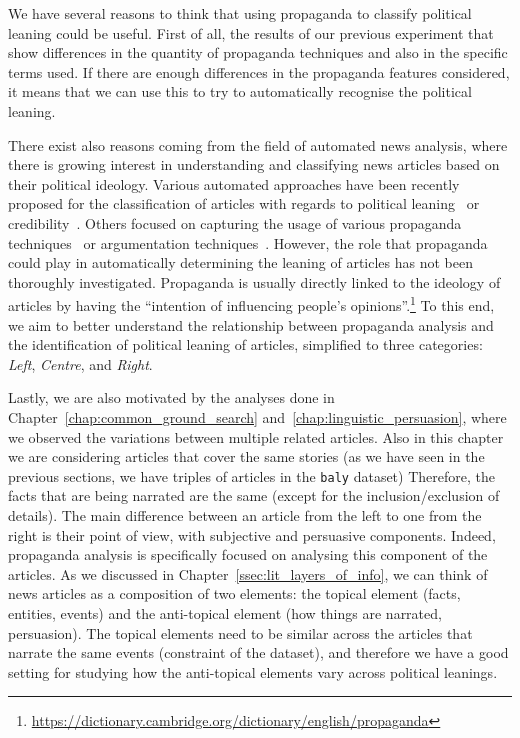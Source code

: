 We have several reasons to think that using propaganda to classify political leaning could be useful.
First of all, the results of our previous experiment that show differences in the quantity of propaganda techniques and also in the specific terms used.
If there are enough differences in the propaganda features considered, it means that we can use this to try to automatically recognise the political leaning.

There exist also reasons coming from the field of automated news analysis, where there is growing interest in understanding and classifying news articles based on their political ideology.
Various automated approaches have been recently proposed for the classification of articles with regards to political leaning~\citep{baly2020we} or credibility~\citep{horne2018assessing}. Others focused on capturing the usage of various propaganda techniques~\citep{da2019fine} or argumentation techniques~\citep{lippi2016argumentation}. However, the role that propaganda could play in automatically determining the leaning of articles has not been thoroughly investigated.
Propaganda is usually directly linked to the ideology of articles by having the ``intention of influencing people's opinions''.\footnote{\url{https://dictionary.cambridge.org/dictionary/english/propaganda}} To this end, we aim to better understand the relationship between propaganda analysis and the identification of political leaning of articles, simplified to three categories: \textit{Left}, \textit{Centre}, and \textit{Right}.

Lastly, we are also motivated by the analyses done in Chapter~\ref{chap:common_ground_search} and~\ref{chap:linguistic_persuasion}, where we observed the variations between multiple related articles.
Also in this chapter we are considering articles that cover the same stories (as we have seen in the previous sections, we have triples of articles in the \texttt{baly} dataset)
Therefore, the facts that are being narrated are the same (except for the inclusion/exclusion of details). The main difference between an article from the left to one from the right is their point of view, with subjective and persuasive components.
Indeed, propaganda analysis is specifically focused on analysing this component of the articles.
As we discussed in Chapter~\ref{ssec:lit_layers_of_info}, we can think of news articles as a composition of two elements: the topical element (facts, entities, events) and the anti-topical element (how things are narrated, persuasion).
The topical elements need to be similar across the articles that narrate the same events (constraint of the dataset), and therefore we have a good setting for studying how the anti-topical elements vary across political leanings. 

